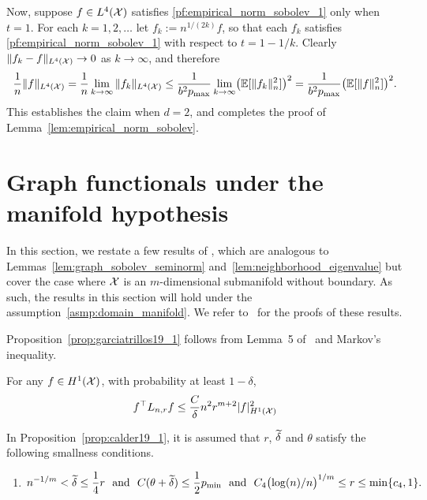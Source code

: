 Now, suppose $f \in L^4(\mathcal{X})$ satisfies \eqref{pf:empirical_norm_sobolev_1} only when $t = 1$. For each $k = 1,2,\ldots$ let $f_k := n^{1/(2k)}f$, so that each $f_k$ satisfies \eqref{pf:empirical_norm_sobolev_1} with respect to $t = 1 - 1/k$. Clearly $\|f_k - f\|_{L^4(\mathcal{X})} \to 0$ as $k \to \infty$, and therefore
\begin{equation*}
\frac{1}{n}\|f\|_{L^4(\mathcal{X})} = \frac{1}{n}\lim_{k \to \infty} \|f_k\|_{L^4(\mathcal{X})} \leq \frac{1}{b^2p_{\max}} \lim_{k \to \infty} \bigl(\mathbb{E}[\|f_k\|_n^2]\bigr)^2 =  \frac{1}{b^2p_{\max}}\bigl(\mathbb{E}[\|f\|_n^2]\bigr)^2.
\end{equation*}
This establishes the claim when $d = 2$, and completes the proof of Lemma~\ref{lem:empirical_norm_sobolev}.

\section{Graph functionals under the manifold hypothesis}
\label{sec:manifold}

In this section, we restate a few results of \citet{trillos2019,calder2019}, which are analogous to Lemmas~\ref{lem:graph_sobolev_seminorm} and~\ref{lem:neighborhood_eigenvalue} but cover the case where $\mathcal{X}$ is an $m$-dimensional submanifold without boundary. As such, the results in this section will hold under the assumption~\ref{asmp:domain_manifold}. We refer to~\citet{trillos2019,calder2019} for the proofs of these results.

Proposition~\ref{prop:garciatrillos19_1} follows from Lemma~5 of~\citet{trillos2019} and Markov's inequality.
\begin{proposition}
	\label{prop:garciatrillos19_1}
	For any $f \in H^1(\mathcal{X})$, with probability at least $1 - \delta$,
	\begin{equation*}
	f^{\top} L_{n,r} f \leq \frac{C}{\delta} n^2 r^{m + 2} |f|_{H^1(\mathcal{X})}^2
	\end{equation*}
\end{proposition}

In Proposition~\ref{prop:calder19_1}, it is assumed that $r$, $\widetilde{\delta}$ and $\theta$ satisfy the following smallness conditions.
\begin{enumerate}[label=(S\arabic*)]
	\item 
	\setcounter{enumi}{1}
	\begin{equation*}
	n^{-1/m} < \widetilde{\delta} \leq \frac{1}{4}r~~\textrm{and}~~C(\theta + \widetilde{\delta}) \leq \frac{1}{2}p_{\min}~~\textrm{and}~~C_4\bigl(\log(n)/n\bigr)^{1/m}\leq r \leq\min\{c_4,1\}.
	\end{equation*}
\end{enumerate}

